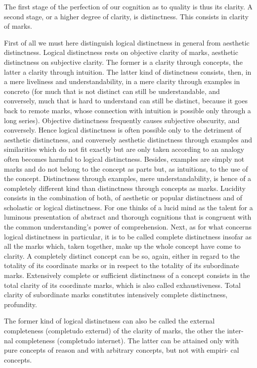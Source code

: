 The first stage of the perfection of our cognition
as to quality is thus its clarity.
A second stage, or a higher degree of clarity, is distinctness.
This consists in clarity of marks.

First of all we must here distinguish
logical distinctness in general from
aesthetic distinctness.
Logical distinctness rests on objective clarity of marks,
aesthetic distinctness on subjective clarity.
The former is a clarity through concepts,
the latter a clarity through intuition.
The latter kind of distinctness consists, then,
in a mere liveliness and understandability,
in a mere clarity through examples in concreto
(for much that is not distinct can still be understandable, and
conversely, much that is hard to understand can still be distinct,
because it goes back to remote marks, whose connection with intuition
is possible only through a long series).
Objective distinctness frequently causes
subjective obscurity, and conversely.
Hence logical distinctness is often possible only to the detriment of
aesthetic distinctness, and conversely aesthetic distinctness
through examples and similarities which do not fit exactly but are only
taken according to an analogy often becomes harmful to logical distinctness.
Besides, examples are simply not marks and do not belong to the
concept as parts but, as intuitions, to the use of the concept.
Distinctness through examples, mere understandability, is hence
of a completely different kind than distinctness through concepts as marks.
Lucidity consists in the combination of both,
of aesthetic or popular distinctness and
of scholastic or logical distinctness.
For one thinks of a lucid mind as the talent for a
luminous presentation of abstract and thorough cognitions
that is congruent with the common understanding's power of comprehension.
Next, as for what concerns logical distinctness in particular,
it is to be called complete distinctness insofar as all the marks
which, taken together, make up the whole concept have come to clarity.
A completely distinct concept can be so, again,
either in regard to the totality of its coordinate marks or
in respect to the totality of its subordinate marks.
Extensively complete or sufficient distinctness of a concept
consists in the total clarity of its coordinate marks,
which is also called exhaustiveness.
Total clarity of subordinate marks constitutes
intensively complete distinctness, profundity.

The former kind of logical distinctness can also be called the external
completeness (completudo externd) of the clarity of marks, the other the inter-
nal completeness (completudo internet). The latter can be attained only with
pure concepts of reason and with arbitrary concepts, but not with empiri-
cal concepts.

